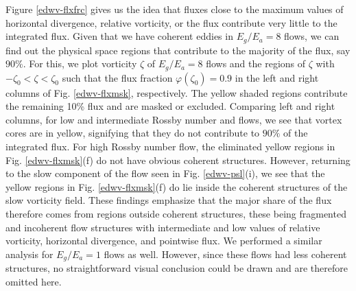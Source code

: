 \documentclass[../Rajarshi-thesis-draft.tex]{subfiles}
\begin{document}
	Figure \ref{edwv-flxfrc} gives us the idea that fluxes close to the maximum values of horizontal divergence, relative vorticity, or the flux contribute very little to the integrated flux. Given that we have coherent eddies in  $E_g/E_a = 8$ flows, we can find out the physical space regions that contribute to the majority of the flux, say $90\%$. For this, we plot vorticity $\zeta$ of $E_g/E_a = 8$ flows and the regions of $\zeta$ with $-\zeta_0 < \zeta < \zeta_0$ such that the flux fraction $\varphi(\zeta_0) = 0.9$ in the left and right columns of Fig. \ref{edwv-flxmsk}, respectively. The yellow shaded regions contribute the remaining  10\% flux and are masked or excluded. Comparing left and right columns, for low and intermediate Rossby number \lre and \ire flows, we see that vortex cores are in yellow, signifying that they do not contribute to $90\%$ of the integrated flux. For high Rossby number \hre flow, the eliminated yellow regions in Fig. \ref{edwv-flxmsk}(f) do not have obvious coherent structures. However, returning to the slow component of the flow seen in Fig. \ref{edwv-psl}(i), we see that the yellow regions in Fig. \ref{edwv-flxmsk}(f) do lie inside the coherent structures of the slow vorticity field.  These findings emphasize that the major share of the flux therefore comes from regions outside coherent structures, these being fragmented and incoherent flow structures with intermediate and low values of relative vorticity, horizontal divergence, and pointwise flux. We performed a similar analysis for $E_g/E_a = 1$ flows as well. However, since these flows had less coherent structures, no straightforward visual conclusion could be drawn and are therefore omitted here. %
	
	
	 
	 
	
	
\end{document}
